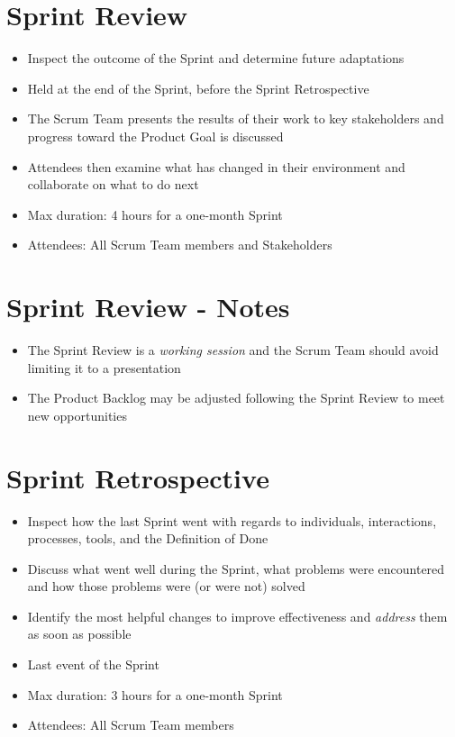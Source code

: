 \documentclass[a4paper,11pt,twocolumn]{article}
\begin{document}
\section*{Sprint Review}
\begin{itemize}
	\item Inspect the outcome of the Sprint and determine future adaptations
	\item Held at the end of the Sprint, before the Sprint Retrospective
	\item The Scrum Team presents the results of their work to key stakeholders and progress toward the Product Goal is discussed
	\item Attendees then examine what has changed in their environment and collaborate on what to do next
	\item Max duration: 4 hours for a one-month Sprint
	\item Attendees: All Scrum Team members and Stakeholders
\end{itemize}

\section*{Sprint Review - Notes}
\begin{itemize}
	\item The Sprint Review is a \textit{working session} and the Scrum Team should avoid limiting it to a presentation
	\item The Product Backlog may be adjusted following the Sprint Review to meet new opportunities
\end{itemize}

\section*{Sprint Retrospective}
\begin{itemize}
	\item Inspect how the last Sprint went with regards to individuals, interactions, processes, tools, and the Definition of Done
	\item Discuss what went well during the Sprint, what problems were encountered and how those problems were (or were not) solved
	\item Identify the most helpful changes to improve effectiveness and \textit{address} them as soon as possible
	\item Last event of the Sprint
	\item Max duration: 3 hours for a one-month Sprint
	\item Attendees: All Scrum Team members
\end{itemize}
\end{document}
